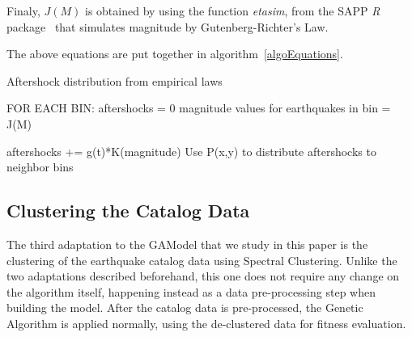 
Finaly, $J(M)$ is obtained by using the function \emph{etasim}, from
the SAPP \textit{R} package~\cite{webSapp} that simulates magnitude by
Gutenberg-Richter’s Law.

The above equations are put together in algorithm~\ref{algoEquations}.

\begin{algorithm}[H]\label{algoEquations}
  \caption{Aftershock distribution from empirical laws}
  \begin{algorithmic}
    \STATE FOR EACH BIN:
    \ENDIF
    \STATE aftershocks = 0
    \STATE magnitude values for earthquakes in bin = J(M)
    
    \STATE aftershocks += g(t)*K(magnitude)
    \ENDFOR
    \ENDFOR
    \STATE Use P(x,y) to distribute aftershocks to neighbor bins
  \end{algorithmic}
\end{algorithm}


\subsection{Clustering the Catalog Data}

The third adaptation to the GAModel that we study in this paper is the
clustering of the earthquake catalog data using Spectral
Clustering. Unlike the two adaptations described beforehand, this one
does not require any change on the algorithm itself, happening instead
as a data pre-processing step when building the model. After the
catalog data is pre-processed, the Genetic Algorithm is applied
normally, using the de-clustered data for fitness evaluation.

